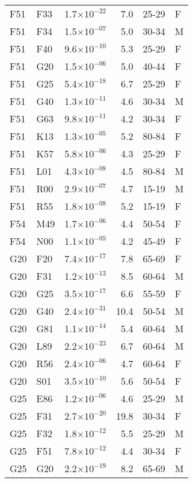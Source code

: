 \begin{longtable}{lllrll}
   F51 & F33 & 1.7$\times10^{-22}$ & 7.0 & 25-29 & F \\ 
   F51 & F34 & 1.5$\times10^{-07}$ & 5.0 & 30-34 & M \\ 
   F51 & F40 & 9.6$\times10^{-10}$ & 5.3 & 25-29 & F \\ 
   F51 & G20 & 1.5$\times10^{-06}$ & 5.0 & 40-44 & F \\ 
   F51 & G25 & 5.4$\times10^{-18}$ & 6.7 & 25-29 & F \\ 
   F51 & G40 & 1.3$\times10^{-11}$ & 4.6 & 30-34 & M \\ 
   F51 & G63 & 9.8$\times10^{-11}$ & 4.2 & 30-34 & F \\ 
   F51 & K13 & 1.3$\times10^{-05}$ & 5.2 & 80-84 & F \\ 
   F51 & K57 & 5.8$\times10^{-06}$ & 4.3 & 25-29 & F \\ 
   F51 & L01 & 4.3$\times10^{-08}$ & 4.5 & 80-84 & M \\ 
   F51 & R00 & 2.9$\times10^{-07}$ & 4.7 & 15-19 & M \\ 
   F51 & R55 & 1.8$\times10^{-08}$ & 5.2 & 15-19 & F \\ 
   F54 & M49 & 1.7$\times10^{-06}$ & 4.4 & 50-54 & F \\ 
   F54 & N00 & 1.1$\times10^{-05}$ & 4.2 & 45-49 & F \\ 
   G20 & F20 & 7.4$\times10^{-17}$ & 7.8 & 65-69 & F \\ 
   G20 & F31 & 1.2$\times10^{-13}$ & 8.5 & 60-64 & M \\ 
   G20 & G25 & 3.5$\times10^{-17}$ & 6.6 & 55-59 & F \\ 
   G20 & G40 & 2.4$\times10^{-31}$ & 10.4 & 50-54 & M \\ 
   G20 & G81 & 1.1$\times10^{-14}$ & 5.4 & 60-64 & M \\ 
   G20 & L89 & 2.2$\times10^{-23}$ & 6.7 & 60-64 & M \\ 
   G20 & R56 & 2.4$\times10^{-06}$ & 4.7 & 60-64 & F \\ 
   G20 & S01 & 3.5$\times10^{-10}$ & 5.6 & 50-54 & F \\ 
   G25 & E86 & 1.2$\times10^{-06}$ & 4.6 & 25-29 & M \\ 
   G25 & F31 & 2.7$\times10^{-20}$ & 19.8 & 30-34 & F \\ 
   G25 & F32 & 1.8$\times10^{-12}$ & 5.5 & 25-29 & M \\ 
   G25 & F51 & 7.8$\times10^{-12}$ & 4.4 & 30-34 & F \\ 
   G25 & G20 & 2.2$\times10^{-19}$ & 8.2 & 65-69 & M \\ 

\end{longtable}
